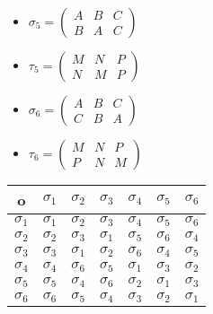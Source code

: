 \begin{enumerate}[{a.}]
\begin{multicols}{2}
\begin{itemize}
	\item
	$\sigma_5 = \begin{pmatrix}
	A & B & C\\
	B & A & C
	\end{pmatrix}$

	\item
	$\tau_5 = \begin{pmatrix}
	M & N & P\\
	N & M & P
	\end{pmatrix}$\\

	\item
	$\sigma_6 = \begin{pmatrix}
	A & B & C\\
	C & B & A
	\end{pmatrix}$

	\item
	$\tau_6 = \begin{pmatrix}
	M & N & P\\
	P & N & M
	\end{pmatrix}$\\
	\end{itemize}
	\end{multicols}
	
	\begin{multicols}{2}
	\begin{tabular}{c| c c c c c c}
		o & $\sigma_1$ & $\sigma_2$ & $\sigma_3$ & $\sigma_4$ & $\sigma_5$ & $\sigma_6$\\
		\hline
		$\sigma_1$ & $\sigma_1$ & $\sigma_2$ & $\sigma_3$ & $\sigma_4$ & $\sigma_5$ & $\sigma_6$\\
		$\sigma_2$ & $\sigma_2$ & $\sigma_3$ & $\sigma_1$ & $\sigma_5$ & $\sigma_6$ & $\sigma_4$\\
		$\sigma_3$ & $\sigma_3$ & $\sigma_1$ & $\sigma_2$ & $\sigma_6$ & $\sigma_4$ & $\sigma_5$\\
		$\sigma_4$ & $\sigma_4$ & $\sigma_6$ & $\sigma_5$ & $\sigma_1$ & $\sigma_3$ & $\sigma_2$\\
		$\sigma_5$ & $\sigma_5$ & $\sigma_4$ & $\sigma_6$ & $\sigma_2$ & $\sigma_1$ & $\sigma_3$\\
		$\sigma_6$ & $\sigma_6$ & $\sigma_5$ & $\sigma_4$ & $\sigma_3$ & $\sigma_2$ & $\sigma_1$\\
	\end{tabular}


\end{multicols}
\end{enumerate}
